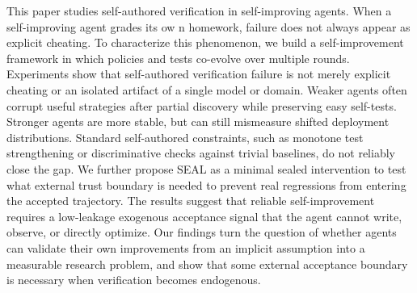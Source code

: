 \documentclass[letterpaper]{article} \usepackage{aaai2027}  \usepackage[hyphens]{url}  \usepackage{graphicx} \urlstyle{rm} \def\UrlFont{\rm}  \usepackage{natbib}  \usepackage{caption} \usepackage{amsfonts} \usepackage{multirow} \frenchspacing  \usepackage{algorithm}
\newcommand{\method}{SEAL}
\begin{document}
This paper studies self-authored verification in self-improving agents.
When a self-improving agent grades its ow     n homework, failure does not always appear as explicit cheating.
To characterize this phenomenon, we build a self-improvement framework in which policies and tests co-evolve over multiple rounds. 
Experiments show that self-authored verification failure is not merely explicit cheating or an isolated artifact of a single model or domain. Weaker agents often corrupt useful strategies after partial discovery while preserving easy self-tests. Stronger agents are more stable, but can still mismeasure shifted deployment distributions. Standard self-authored constraints, such as monotone test strengthening or discriminative checks against trivial baselines, do not reliably close the gap.
We further propose \method{} as a minimal sealed intervention to test what external trust boundary is needed to prevent real regressions from entering the accepted trajectory. 
The results suggest that reliable self-improvement requires a low-leakage exogenous acceptance signal that the agent cannot write, observe, or directly optimize. 
Our findings turn the question of whether agents can validate their own improvements from an implicit assumption into a measurable research problem, and show that some external acceptance boundary is necessary when verification becomes endogenous.
\end{document}
